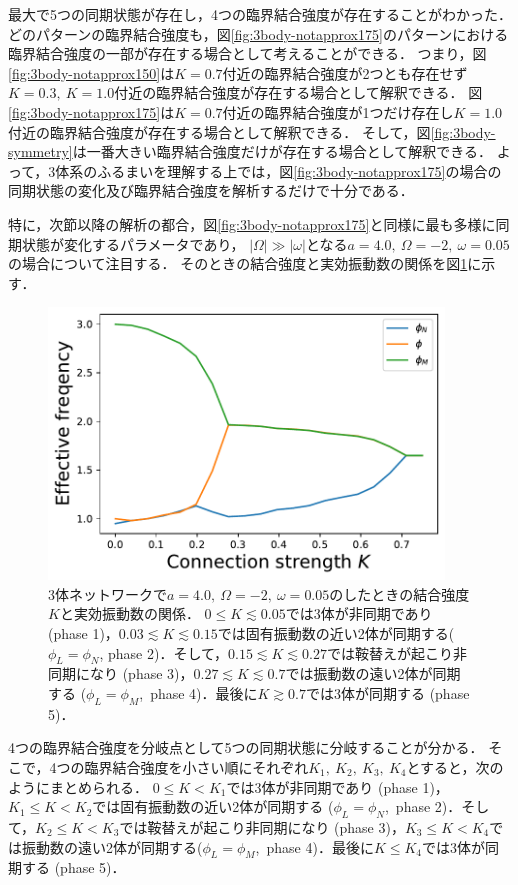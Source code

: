 \documentclass[../main]{subfiles}
\begin{document}
最大で5つの同期状態が存在し，4つの臨界結合強度が存在することがわかった．
どのパターンの臨界結合強度も，図\ref{fig:3body-notapprox175}のパターンにおける臨界結合強度の一部が存在する場合として考えることができる．
つまり，図\ref{fig:3body-notapprox150}は$K=0.7$付近の臨界結合強度が2つとも存在せず$K=0.3,\ K=1.0$付近の臨界結合強度が存在する場合として解釈できる．
図\ref{fig:3body-notapprox175}は$K=0.7$付近の臨界結合強度が1つだけ存在し$K=1.0$付近の臨界結合強度が存在する場合として解釈できる．
そして，図\ref{fig:3body-symmetry}は一番大きい臨界結合強度だけが存在する場合として解釈できる．
よって，3体系のふるまいを理解する上では，図\ref{fig:3body-notapprox175}の場合の同期状態の変化及び臨界結合強度を解析するだけで十分である．

特に，次節以降の解析の都合，図\ref{fig:3body-notapprox175}と同様に最も多様に同期状態が変化するパラメータであり，
$|\Omega|\gg|\omega|$となる$a=4.0,\ \Omega=-2,\ \omega=0.05$の場合について注目する．
そのときの結合強度と実効振動数の関係を図\ref{fig:3body-state}に示す．
\begin{figure}[tbp]
\centering
\includegraphics[width=105mm]{./images/three-body-prob.pdf}
\centering
\caption{3体ネットワークで$a=4.0,\ \Omega=-2,\ \omega=0.05$のしたときの結合強度$K$と実効振動数の関係．
$0\leq K\lesssim 0.05$では3体が非同期であり (phase 1)，$0.03\lesssim K\lesssim 0.15$では固有振動数の近い2体が同期する($\phi_L=\phi_N$, phase 2)．そして，$0.15 \lesssim K\lesssim 0.27$では鞍替えが起こり非同期になり (phase 3)，$0.27\lesssim K\lesssim 0.7$では振動数の遠い2体が同期する ($\phi_L=\phi_M$,\ phase 4)．最後に$K\gtrsim 0.7$では3体が同期する (phase 5)．}
\label{fig:3body-state}
\end{figure}
4つの臨界結合強度を分岐点として5つの同期状態に分岐することが分かる．
そこで，4つの臨界結合強度を小さい順にそれぞれ$K_1,\ K_2,\ K_3,\ K_4$とすると，次のようにまとめられる．
$0\leq K<K_1$では3体が非同期であり (phase 1)，$K_1\leq K<K_2$では固有振動数の近い2体が同期する ($\phi_L=\phi_N$,\ phase 2)．そして，$K_2\leq K<K_3$では鞍替えが起こり非同期になり (phase 3)，$K_3\leq K<K_4$では振動数の遠い2体が同期する($\phi_L=\phi_M$,\ phase 4)．最後に$K\leq K_4$では3体が同期する (phase 5)．
\end{document}
